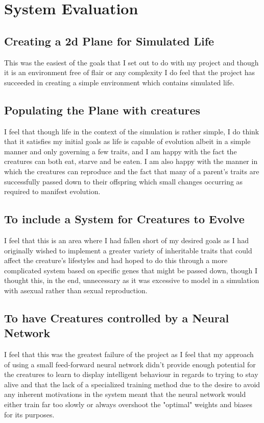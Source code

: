 \chapter{System Evaluation}
\section{Creating a 2d Plane for Simulated Life}
This was the easiest of the goals that I set out to do with my project and though it is an environment free of flair or any complexity I do feel that the project has succeeded in creating a simple environment which contains simulated life.
\section{Populating the Plane with creatures}
I feel that though life in the context of the simulation is rather simple, I do think that it satisfies my initial goals as life is capable of evolution albeit in a simple manner and only governing a few traits, and I am happy with the fact the creatures can both eat, starve and be eaten. I am also happy with the manner in which the creatures can reproduce and the fact that many of a parent's traits are successfully passed down to their offspring which small changes occurring as required to manifest evolution.
\section{To include a System for Creatures to Evolve}
I feel that this is an area where I had fallen short of my desired goals as I had originally wished to implement a greater variety of inheritable traits that could affect the creature's lifestyles and had hoped to do this through a more complicated system based on specific genes that might be passed down, though I thought this, in the end, unnecessary as it was excessive to model in a simulation with asexual rather than sexual reproduction.
\section{To have Creatures controlled by a Neural Network}
I feel that this was the greatest failure of the project as I feel that my approach of using a small feed-forward neural network didn't provide enough potential for the creatures to learn to display intelligent behaviour in regards to trying to stay alive and that the lack of a specialized training method due to the desire to avoid any inherent motivations in the system meant that the neural network would either train far too slowly or always overshoot the "optimal" weights and biases for its purposes.
